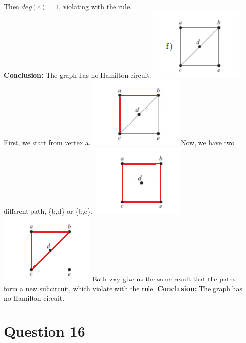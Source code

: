 \documentclass{article}
\begin{document}
Then $deg(c) = 1$, violating with the rule.\\
\textbf{Conclusion:} The graph has no Hamilton circuit.
\newline
\includegraphics[scale = 2]{Question 15/connectivity_15.f.png}
\newline
First, we start from vertex a.
\newline
\includegraphics[scale = 2]{Question 15/connectivity_15.f.1.png}
\newline
Now, we have two different path, \{b,d\} or \{b,e\}.
\newline
\includegraphics[scale = 2]{Question 15/connectivity_15.f.2.png}
\includegraphics[scale = 2]{Question 15/connectivity_15.f.3.png}
\newline
Both way give us the same result that the paths form a new subcircuit, which violate with the rule.
\textbf{Conclusion:} The graph has no Hamilton circuit.

\section*{Question 16}
\end{document}
